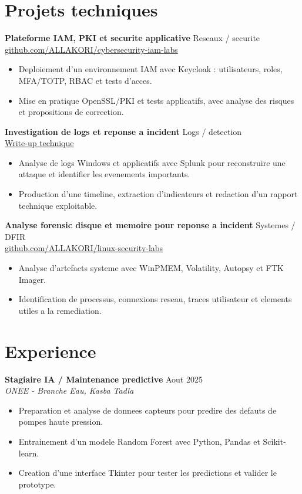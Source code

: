 \documentclass[10pt,a4paper]{article}
\newcommand{\role}[3]{%
  \textbf{#1} \hfill #3\\
  \textit{#2}\vspace{1pt}
}
\begin{document}
\section{Projets techniques}
\textbf{Plateforme IAM, PKI et securite applicative} \hfill Reseaux / securite\\
\href{https://github.com/ALLAKORI/cybersecurity-iam-labs}{github.com/ALLAKORI/cybersecurity-iam-labs}
\begin{itemize}
  \item Deploiement d'un environnement IAM avec Keycloak : utilisateurs, roles, MFA/TOTP, RBAC et tests d'acces.
  \item Mise en pratique OpenSSL/PKI et tests applicatifs, avec analyse des risques et propositions de correction.
\end{itemize}

\textbf{Investigation de logs et reponse a incident} \hfill Logs / detection\\
\href{https://allakori.github.io/writeups/posts/volt-typhoon-intrusion/}{Write-up technique}
\begin{itemize}
  \item Analyse de logs Windows et applicatifs avec Splunk pour reconstruire une attaque et identifier les evenements importants.
  \item Production d'une timeline, extraction d'indicateurs et redaction d'un rapport technique exploitable.
\end{itemize}

\textbf{Analyse forensic disque et memoire pour reponse a incident} \hfill Systemes / DFIR\\
\href{https://github.com/ALLAKORI/linux-security-labs}{github.com/ALLAKORI/linux-security-labs}
\begin{itemize}
  \item Analyse d'artefacts systeme avec WinPMEM, Volatility, Autopsy et FTK Imager.
  \item Identification de processus, connexions reseau, traces utilisateur et elements utiles a la remediation.
\end{itemize}

\section{Experience}
\role{Stagiaire IA / Maintenance predictive}{ONEE - Branche Eau, Kasba Tadla}{Aout 2025}
\begin{itemize}
  \item Preparation et analyse de donnees capteurs pour predire des defauts de pompes haute pression.
  \item Entrainement d'un modele Random Forest avec Python, Pandas et Scikit-learn.
  \item Creation d'une interface Tkinter pour tester les predictions et valider le prototype.
\end{itemize}
\end{document}
